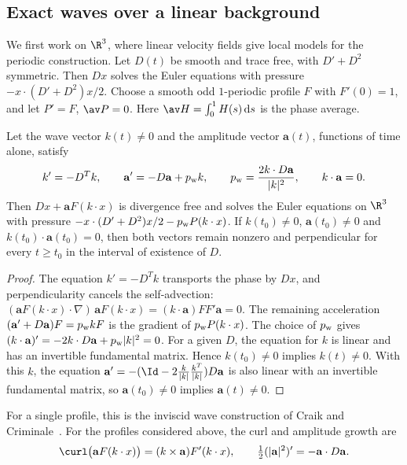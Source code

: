 \subsection{Exact waves over a linear background}\label{cc:sec:affine}
We first work on $\R^3$, where linear velocity fields give local models for the
periodic construction. Let $D(t)$ be smooth and trace free, with
$D'+D^2$ symmetric. Then $Dx$ solves the Euler equations with pressure
$-x\cdot(D'+D^2)x/2$. Choose a smooth odd $1$-periodic profile
$F$ with $F'(0)=1$, and let $P'=F$, $\av P=0$.
Here $\av H=\int_0^1H(s)\,\mathrm ds$ is the phase average.

\begin{lemma}\label{cc:lem:wave}
Let the wave vector $k(t)\ne0$ and the amplitude vector $\mathbf a(t)$,
functions of time alone, satisfy
\begin{equation}\label{cc:eq:wave-ode}
 k'=-D^Tk,\qquad
 \mathbf a'=-D\mathbf a+p_{\rm w} k,\qquad
 p_{\rm w}=\frac{2k\cdot D\mathbf a}{|k|^2},\qquad
 k\cdot\mathbf a=0.
\end{equation}
Then $Dx+\mathbf aF(k\cdot x)$ is divergence free and solves the Euler equations on $\R^3$ with
pressure $-x\cdot(D'+D^2)x/2-p_{\rm w} P(k\cdot x)$.
If $k(t_0)\ne0$, $\mathbf a(t_0)\ne0$ and
$k(t_0)\cdot\mathbf a(t_0)=0$, then both vectors remain nonzero and
perpendicular for every $t\ge t_0$ in the interval of existence of $D$.
\end{lemma}
\begin{proof}
The equation $k'=-D^Tk$ transports the phase by $Dx$, and
perpendicularity cancels the self-advection:
$(\mathbf aF(k\cdot x)\cdot\nabla)\,\mathbf aF(k\cdot x)
=(k\cdot\mathbf a)FF'\mathbf a=0$. The remaining
acceleration $(\mathbf a'+D\mathbf a)F=p_{\rm w} kF$ is the gradient of
$p_{\rm w} P(k\cdot x)$.
The choice of $p_{\rm w}$ gives
$(k\cdot\mathbf a)'=-2k\cdot D\mathbf a+p_{\rm w}|k|^2=0$.
For a given $D$, the equation for $k$ is linear and has an invertible
fundamental matrix. Hence $k(t_0)\ne0$ implies $k(t)\ne0$. With this
$k$, the equation
$\mathbf a'=-(\Id-2\frac{k}{|k|}\frac{k^T}{|k|})D\mathbf a$
is also linear with an invertible fundamental matrix, so
$\mathbf a(t_0)\ne0$ implies $\mathbf a(t)\ne0$.
\end{proof}

For a single profile, this is the inviscid wave construction of
Craik and Criminale~\cite{CraikCriminale}. For the profiles considered
above, the curl and amplitude growth are
\[
 \curl\bigl(\mathbf aF(k\cdot x)\bigr)
       =(k\times\mathbf a)F'(k\cdot x),\qquad
 \tfrac12(|\mathbf a|^2)'=-\mathbf a\cdot D\mathbf a.
\]

